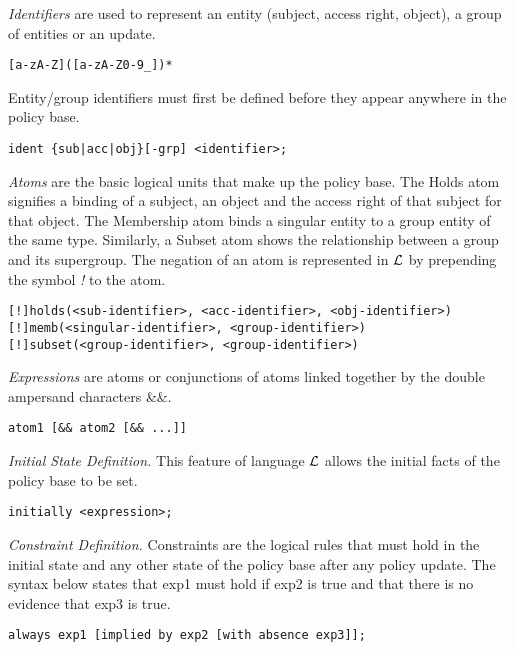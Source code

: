 \documentclass{llncs}
\begin{document}
    \emph{Identifiers} are used to represent an entity (subject, access
    right, object), a group of entities or an update.

    \begin{verbatim}[a-zA-Z]([a-zA-Z0-9_])*\end{verbatim}

    Entity/group identifiers must first be defined before they appear
    anywhere in the policy base.

    \begin{verbatim}ident {sub|acc|obj}[-grp] <identifier>;\end{verbatim}

    \emph{Atoms} are the basic logical units that make up the policy base.
    The Holds atom signifies a binding of a subject, an object and the
    access right of that subject for that object. The Membership atom binds
    a singular entity to a group entity of the same type. Similarly, a Subset
    atom shows the relationship between a group and its supergroup. The
    negation of an atom is represented in $\cal{L}$ by prepending the symbol
    \emph{!} to the atom.

    \begin{verbatim}[!]holds(<sub-identifier>, <acc-identifier>, <obj-identifier>)
[!]memb(<singular-identifier>, <group-identifier>)
[!]subset(<group-identifier>, <group-identifier>)\end{verbatim}

    \emph{Expressions} are atoms or conjunctions of atoms linked together by
    the double ampersand characters \&\&.

    \begin{verbatim}atom1 [&& atom2 [&& ...]]\end{verbatim}

    \emph{Initial State Definition.} This feature of language $\cal{L}$ allows
    the initial facts of the policy base to be set.

    \begin{verbatim}initially <expression>;\end{verbatim}

    \emph{Constraint Definition.} Constraints are the logical rules that must
    hold in the initial state and any other state of the policy base after
    any policy update. The syntax below states that exp1 must hold if exp2 is 
    true and that there is no evidence that exp3 is true.

    \begin{verbatim}always exp1 [implied by exp2 [with absence exp3]];\end{verbatim}
\end{document}
